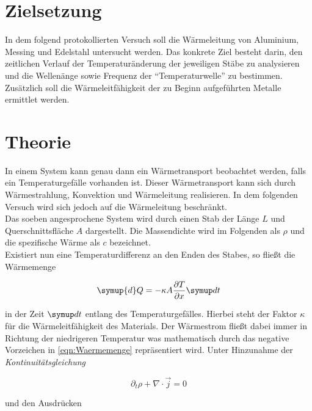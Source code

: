 %

%
\section{Zielsetzung}
\label{sec:Zielsetzung}

In dem folgend protokollierten Versuch soll die Wärmeleitung von
Aluminium, Messing und Edelstahl untersucht werden. Das konkrete Ziel besteht
darin, den zeitlichen Verlauf der Temperaturänderung der jeweiligen Stäbe zu analysieren
und die Wellenänge sowie Frequenz der \enquote{Temperaturwelle} zu bestimmen. Zusätzlich soll
die Wärmeleitfähigkeit der zu Beginn aufgeführten Metalle ermittlet werden.

\section{Theorie}
\label{sec:Theorie}

In einem System kann genau dann ein Wärmetransport beobachtet werden, falls ein Temperaturgefälle vorhanden ist. Dieser Wärmetransport kann sich durch Wärmestrahlung, Konvektion und Wärmeleitung
realisieren. In dem folgenden Versuch wird sich jedoch auf die Wärmeleitung beschränkt. \\
Das soeben angesprochene System wird durch einen Stab der Länge $L$ und Querschnittsfläche $A$ dargestellt.
Die Massendichte wird im Folgenden als $\rho$ und die spezifische Wärme als $c$ bezeichnet. \\
Existiert nun eine Temperaturdifferenz an den Enden des Stabes, so fließt die Wärmemenge

\begin{equation}
\label{eqn:Waermemenge}
    \symup {d} Q = -\kappa{}A\frac{\partial{}T}{\partial{}x} \symup d t 
\end{equation}

in der Zeit $\symup d t$ entlang des Temperaturgefälles. Hierbei steht der Faktor $\kappa$ für die Wärmeleitfähigkeit
des Materials. Der Wärmestrom fließt dabei immer in Richtung der niedrigeren Temperatur was mathematisch durch 
das negative Vorzeichen in \eqref{eqn:Waermemenge} repräsentiert wird. Unter Hinzunahme der \emph{Kontinuitätsgleichung}

\begin{equation}
    \partial{}_t \rho + \nabla{}\cdot{}\vec{j} = 0
\end{equation}

und den Ausdrücken

